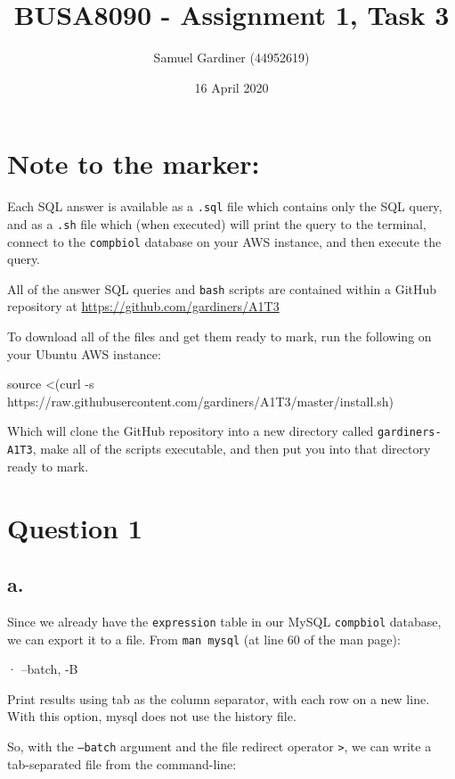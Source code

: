 \documentclass{article}
\title{BUSA8090 - Assignment 1, Task 3}
\author{Samuel Gardiner (44952619)}
\date{16 April 2020}
\begin{document}
\maketitle

\section{Note to the marker:}

Each SQL answer is available as a \texttt{.sql} file which contains only the SQL query, and as a \texttt{.sh} file which (when executed) will print the query to the terminal, connect to the \texttt{compbiol} database on your AWS instance, and then execute the query.

All of the answer SQL queries and \texttt{bash} scripts are contained within a GitHub repository at \url{https://github.com/gardiners/A1T3}

To download all of the files and get them ready to mark, run the following on your Ubuntu AWS instance: 

\begin{longinline}
source <(curl -s https://raw.githubusercontent.com/gardiners/A1T3/master/install.sh)
\end{longinline}

Which will clone the GitHub repository into a new directory called \texttt{gardiners-A1T3}, make all of the scripts executable, and then put you into that directory ready to mark.



\section{Question 1}

\subsection{a.}

Since we already have the \texttt{expression} table in our MySQL \texttt{compbiol} database, we can export it to a file. From \texttt{man mysql} (at line 60 of the man page):

\begin{bashinline}
   ·   --batch, -B

           Print results using tab as the column separator, with each row on a new line. With this option, mysql does not use the history file.
\end{bashinline}

So, with the \texttt{--batch} argument and the file redirect operator \texttt{>}, we can write a tab-separated file from the command-line:
\end{document}
